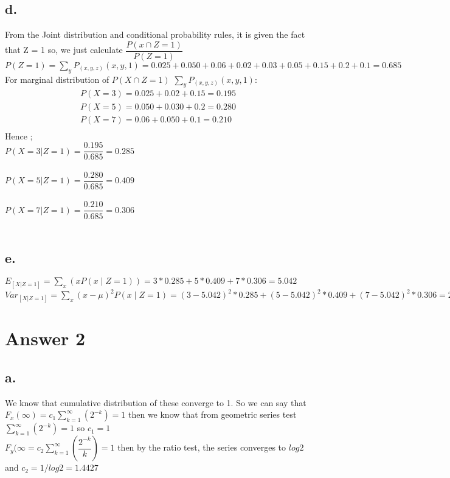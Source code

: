 \documentclass[12pt]{article}
\begin{document}
\subsection*{d.}
From the Joint distribution and conditional probability rules, it is given the fact that Z = 1 so, we just calculate
$\dfrac{P(x \cap Z=1)}{P(Z=1)}$ \\
$P(Z=1)=\sum_{y}P_{(x,y,z)}(x,y,1) = 0.025+0.050+0.06+0.02+0.03+0.05+0.15+0.2+0.1=0.685$ \\
For marginal distribution of  $P(X\cap Z=1)$ $\sum_{y}P_{(x,y,z)}(x,y,1)$:
\begin{equation} 
\begin{split}
P(X=3) = 0.025+0.02+0.15 = 0.195 \\
P(X=5) = 0.050+0.030+0.2 = 0.280 \\
P(X=7) = 0.06+0.050+0.1 = 0.210 \\
\end{split}
\end{equation}
Hence ; \\
$ P(X=3 | Z=1) = \dfrac{0.195}{0.685}= 0.285$ \\ \\
$ P(X=5 | Z=1) = \dfrac{0.280}{0.685} = 0.409$ \\ \\
$ P(X=7 | Z=1) = \dfrac{0.210}{0.685} = 0.306$ \\ \\
\subsection*{e.}
$E_{[X | Z=1]}= \sum_x(xP(x \; | \; Z =1)) = 3*0.285+5*0.409+7*0.306 = 5.042$ \\
$Var_{[X | Z=1]} = \sum_x(x-\mu)^2P(x \; | \; Z =1) = (3-5.042)^2*0.285+(5-5.042)^2*0.409+(7-5.042)^2*0.306 = 2.3622$
\section*{Answer 2}

\subsection*{a.}
We know that cumulative distribution of these converge to 1. So we can say that \\
$F_x(\infty) = c_1\sum_{k=1}^{\infty}(2^{-k}) = 1 $ then we know that from geometric series test $\sum_{k=1}^{\infty}(2^{-k}) = 1$ so $c_1 = 1$ \\
$F_y(\infty = c_2\sum_{k=1}^{\infty}(\dfrac{2^{-k}}{k}) = 1$ then by the ratio test, the series converges to $log2$ and $c_2 = 1/log2 = 1.4427$
\end{document}
